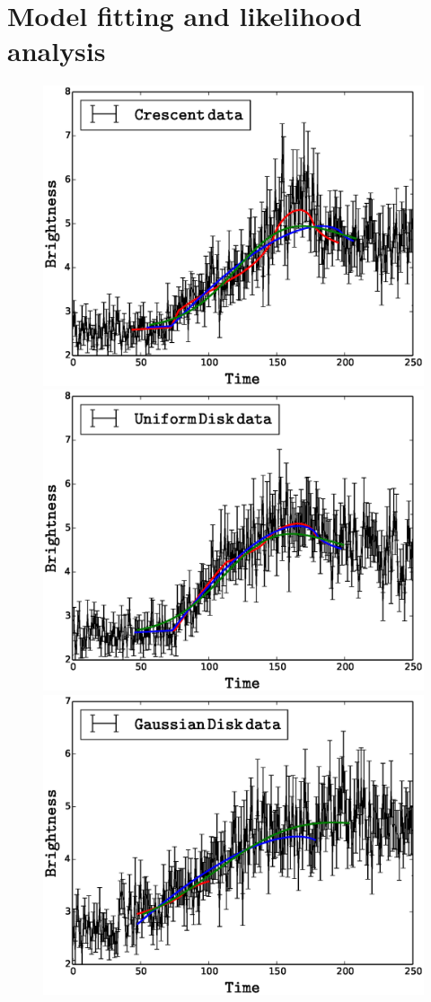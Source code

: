 \section{Model fitting and likelihood analysis}\label{sec:fitting}

\begin{figure}
\centering
\includegraphics[width=0.9\hsize]{plots/data_cc.eps}
\includegraphics[width=0.9\hsize]{plots/data_dd.eps}
\includegraphics[width=0.9\hsize]{plots/data_gg.eps}

\end{figure}
